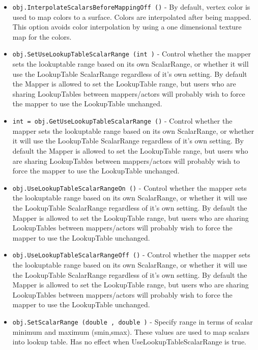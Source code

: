 \begin{itemize}
\item  \verb|obj.InterpolateScalarsBeforeMappingOff ()| -  By default, vertex color is used to map colors to a surface.
 Colors are interpolated after being mapped.
 This option avoids color interpolation by using a one dimensional
 texture map for the colors.

\item  \verb|obj.SetUseLookupTableScalarRange (int )| -  Control whether the mapper sets the lookuptable range based on its
 own ScalarRange, or whether it will use the LookupTable ScalarRange
 regardless of it's own setting. By default the Mapper is allowed to set
 the LookupTable range, but users who are sharing LookupTables between
 mappers/actors will probably wish to force the mapper to use the
 LookupTable unchanged.

\item  \verb|int = obj.GetUseLookupTableScalarRange ()| -  Control whether the mapper sets the lookuptable range based on its
 own ScalarRange, or whether it will use the LookupTable ScalarRange
 regardless of it's own setting. By default the Mapper is allowed to set
 the LookupTable range, but users who are sharing LookupTables between
 mappers/actors will probably wish to force the mapper to use the
 LookupTable unchanged.

\item  \verb|obj.UseLookupTableScalarRangeOn ()| -  Control whether the mapper sets the lookuptable range based on its
 own ScalarRange, or whether it will use the LookupTable ScalarRange
 regardless of it's own setting. By default the Mapper is allowed to set
 the LookupTable range, but users who are sharing LookupTables between
 mappers/actors will probably wish to force the mapper to use the
 LookupTable unchanged.

\item  \verb|obj.UseLookupTableScalarRangeOff ()| -  Control whether the mapper sets the lookuptable range based on its
 own ScalarRange, or whether it will use the LookupTable ScalarRange
 regardless of it's own setting. By default the Mapper is allowed to set
 the LookupTable range, but users who are sharing LookupTables between
 mappers/actors will probably wish to force the mapper to use the
 LookupTable unchanged.

\item  \verb|obj.SetScalarRange (double , double )| -  Specify range in terms of scalar minimum and maximum (smin,smax). These
 values are used to map scalars into lookup table. Has no effect when
 UseLookupTableScalarRange is true.


\end{itemize}
